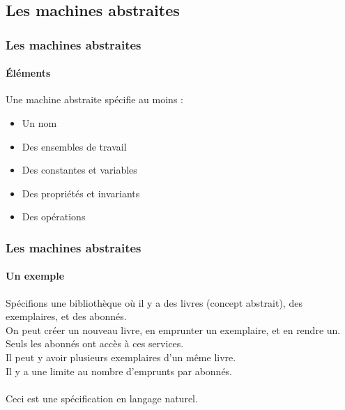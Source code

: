 \documentclass[11pt,a4paper,xcolor=table]{beamer} %
\begin{document}
\subsection{Les machines abstraites}
\begin{frame}
\frametitle{Les machines abstraites}
\framesubtitle{Éléments}
Une machine abstraite spécifie au moins :
\begin{itemize}
\pause
\item Un nom
\pause
\item Des ensembles de travail
\pause
\item Des constantes et variables
\pause
\item Des propriétés et invariants
\pause
\item Des opérations
\end{itemize}
\end{frame}

\begin{frame}
\frametitle{Les machines abstraites}
\framesubtitle{Un exemple}
Spécifions une bibliothèque où il y a des livres (concept abstrait), des exemplaires, et des abonnés.\\\pause
On peut créer un nouveau livre, \pause en emprunter un exemplaire, \pause et en rendre un.
\\\pause Seuls les abonnés ont accès à ces services.
\\\pause Il peut y avoir plusieurs exemplaires d'un même livre.
\\\pause Il y a une limite au nombre d'emprunts par abonnés.
\\~\\\pause Ceci est une spécification en langage naturel.
\end{frame}
\end{document}
